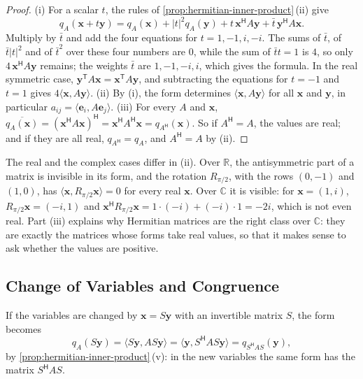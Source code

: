 \begin{proof}
(i) For a scalar $t$, the rules of \cref{prop:hermitian-inner-product}\,(ii) give
\[
q_A(\mathbf x+t\mathbf y)=q_A(\mathbf x)+|t|^2q_A(\mathbf y)+t\,\mathbf x^{\mathsf H}A\mathbf y+\bar t\,\mathbf y^{\mathsf H}A\mathbf x .
\]
Multiply by $\bar t$ and add the four equations for $t=1,-1,i,-i$. The sums of $\bar t$, of $\bar t|t|^2$ and of $\bar t^2$ over these four numbers are $0$, while the sum of $\bar tt=1$ is $4$, so only $4\,\mathbf x^{\mathsf H}A\mathbf y$ remains; the weights $\bar t$ are $1,-1,-i,i$, which gives the formula. In the real symmetric case, $\mathbf y^{\mathsf T}A\mathbf x=\mathbf x^{\mathsf T}A\mathbf y$, and subtracting the equations for $t=-1$ and $t=1$ gives $4\langle\mathbf x,A\mathbf y\rangle$. (ii) By (i), the form determines $\langle\mathbf x,A\mathbf y\rangle$ for all $\mathbf x$ and $\mathbf y$, in particular $a_{ij}=\langle\mathbf e_i,A\mathbf e_j\rangle$. (iii) For every $A$ and $\mathbf x$, $\overline{q_A(\mathbf x)}=(\mathbf x^{\mathsf H}A\mathbf x)^{\mathsf H}=\mathbf x^{\mathsf H}A^{\mathsf H}\mathbf x=q_{A^{\mathsf H}}(\mathbf x)$. So if $A^{\mathsf H}=A$, the values are real; and if they are all real, $q_{A^{\mathsf H}}=q_A$, and $A^{\mathsf H}=A$ by (ii).
\end{proof}

The real and the complex cases differ in (ii). Over $\mathbb R$, the antisymmetric part of a matrix is invisible in its form, and the rotation $R_{\pi/2}$, with the rows $(0,-1)$ and $(1,0)$, has $\langle\mathbf x,R_{\pi/2}\mathbf x\rangle=0$ for every real $\mathbf x$. Over $\mathbb C$ it is visible: for $\mathbf x=(1,i)$, $R_{\pi/2}\mathbf x=(-i,1)$ and $\mathbf x^{\mathsf H}R_{\pi/2}\mathbf x=1\cdot(-i)+(-i)\cdot1=-2i$, which is not even real. Part (iii) explains why Hermitian matrices are the right class over $\mathbb C$: they are exactly the matrices whose forms take real values, so that it makes sense to ask whether the values are positive.

\subsection{Change of Variables and Congruence}

If the variables are changed by $\mathbf x=S\mathbf y$ with an invertible matrix $S$, the form becomes
\[
q_A(S\mathbf y)=\langle S\mathbf y,AS\mathbf y\rangle=\langle\mathbf y,S^{\mathsf H}AS\mathbf y\rangle=q_{S^{\mathsf H}AS}(\mathbf y),
\]
by \cref{prop:hermitian-inner-product}\,(v): in the new variables the same form has the matrix $S^{\mathsf H}AS$.

